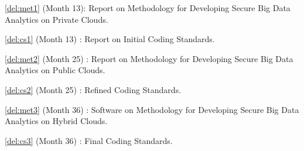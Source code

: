 \begin{Workpackage}{\thewpno}
%	
%	
%	




\begin{WPDeliverables}
\begin{compactitem}
\item \ref{del:met1} (Month 13): Report on \TheProject{} Methodology for Developing Secure Big Data Analytics on Private Clouds.
\item \ref{del:cs1} (Month 13) : Report on Initial \TheProject{} Coding Standards.
\item \ref{del:met2} (Month 25) : Report on \TheProject{} Methodology for Developing Secure Big Data Analytics on Public Clouds.
\item \ref{del:cs2} (Month 25) : Refined \TheProject{} Coding Standards.
\item \ref{del:met3} (Month 36) : Software on \TheProject{} Methodology for Developing Secure Big Data Analytics on Hybrid Clouds.
\item \ref{del:cs3} (Month 36) : Final \TheProject{} Coding Standards.
\end{compactitem}
\end{WPDeliverables}
\end{Workpackage}
